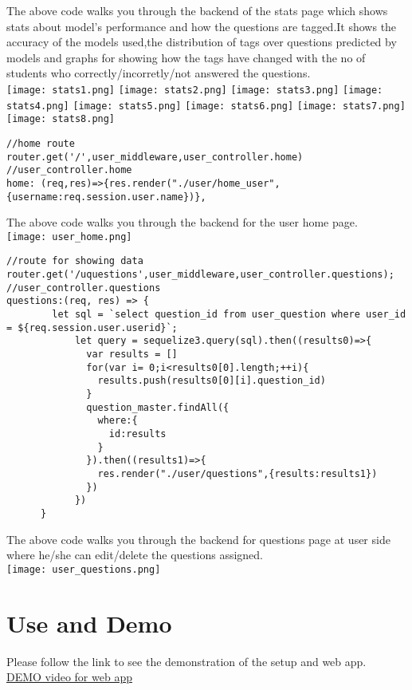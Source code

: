 \documentclass[a4paper,12pt,oneside]{book}
\begin{document}
The above code walks you through the backend of the stats page which shows stats about model's performance and how the questions are tagged.It shows the accuracy of the models used,the distribution of tags over questions predicted by models and graphs for showing how the tags have changed with the no of students who correctly/incorretly/not answered the questions.\\
\texttt{[image: stats1.png]}
\texttt{[image: stats2.png]}
\texttt{[image: stats3.png]}
\texttt{[image: stats4.png]}
\texttt{[image: stats5.png]}
\texttt{[image: stats6.png]}
\texttt{[image: stats7.png]}
\texttt{[image: stats8.png]}\\
\begin{lstlisting}[caption=User Home Route]
//home route
router.get('/',user_middleware,user_controller.home)
//user_controller.home
home: (req,res)=>{res.render("./user/home_user",{username:req.session.user.name})},
\end{lstlisting}
The above code walks you through the backend for the user home page.\\
\texttt{[image: user\_home.png]}
\begin{lstlisting}
//route for showing data
router.get('/uquestions',user_middleware,user_controller.questions);
//user_controller.questions
questions:(req, res) => {
        let sql = `select question_id from user_question where user_id = ${req.session.user.userid}`;
            let query = sequelize3.query(sql).then((results0)=>{
              var results = []
              for(var i= 0;i<results0[0].length;++i){
                results.push(results0[0][i].question_id)
              }
              question_master.findAll({
                where:{
                  id:results
                }
              }).then((results1)=>{
                res.render("./user/questions",{results:results1})
              })
            })
      }
\end{lstlisting}
The above code walks you through the backend for questions page at user side where he/she can edit/delete the questions assigned.\\
\texttt{[image: user\_questions.png]}
\section{Use and Demo}
Please follow the link to see the demonstration of the setup and web app.\\
\href{https://www.youtube.com/watch?v=pJj7sUYC_CE&feature=youtu.be}{DEMO video for web app} 
\end{document}
